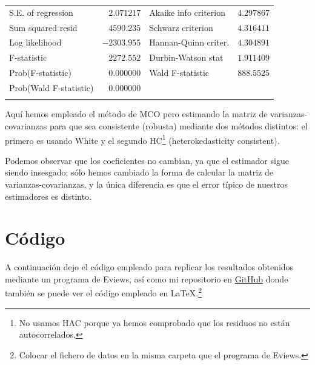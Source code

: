 \documentclass[12pt]{article}
\numberwithin{equation}{section} %
\begin{document}
\begin{table}[H]
\begin{tabular}{lrrrr}
\multicolumn{1}{l}{S.E. of regression}&\multicolumn{1}{r}{$2.071217$}&\multicolumn{2}{l}{Akaike info criterion}&\multicolumn{1}{r}{$4.297867$}\\
\multicolumn{1}{l}{Sum squared resid}&\multicolumn{1}{r}{$4590.235$}&\multicolumn{2}{l}{Schwarz criterion}&\multicolumn{1}{r}{$4.316411$}\\
\multicolumn{1}{l}{Log likelihood}&\multicolumn{1}{r}{$-2303.955$}&\multicolumn{2}{l}{Hannan-Quinn criter.}&\multicolumn{1}{r}{$4.304891$}\\
\multicolumn{1}{l}{F-statistic}&\multicolumn{1}{r}{$2272.552$}&\multicolumn{2}{l}{Durbin-Watson stat}&\multicolumn{1}{r}{$1.911409$}\\
\multicolumn{1}{l}{Prob(F-statistic)}&\multicolumn{1}{r}{$0.000000$}&\multicolumn{2}{l}{Wald F-statistic}&\multicolumn{1}{r}{$888.5525$}\\
\multicolumn{1}{l}{Prob(Wald F-statistic)}&\multicolumn{1}{r}{$0.000000$}&\multicolumn{1}{c}{}&\multicolumn{1}{c}{}&\multicolumn{1}{c}{}\\
[4.5pt] \hline \\ [-4.5pt]
\end{tabular}
\end{table}

Aquí hemos empleado el método de MCO pero estimando la matriz de varianzas-covarianzas para que sea consistente (robusta) mediante dos métodos distintos: el primero es usando White y el segundo HC\footnote{No usamos HAC porque ya hemos comprobado que los residuos no están autocorrelados.} (heterokedasticity consistent). 

Podemos observar que los coeficientes no cambian, ya que el estimador sigue siendo insesgado; sólo hemos cambiado la forma de calcular la matriz de varianzas-covarianzas, y la única diferencia es que el error típico de nuestros estimadores es distinto.

\section{Código}

A continuación dejo el código empleado para replicar los resultados obtenidos mediante un programa de Eviews, así como mi repositorio en \href{https://github.com/mdelallave/Econometria_financiera/tree/master/primera_entrega}{GitHub} donde también se puede ver el código empleado en \LaTeX.\footnote{Colocar el fichero de datos en la misma carpeta que el programa de Eviews.}


\end{document}
